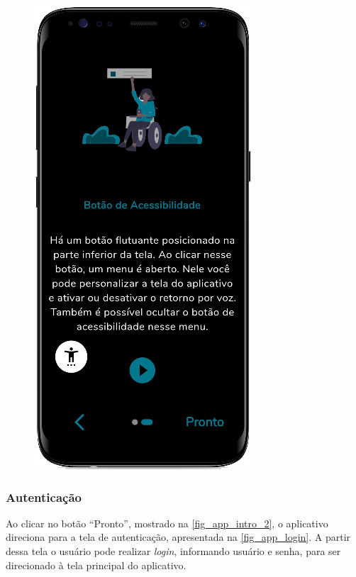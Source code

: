 \begin{figure}[htb]
\begin{minipage}{0.44\textwidth}
        \includegraphics[scale=0.63]{Imagens/desenvolvimento/app/app_intro_2.png}
    \end{minipage}
\end{figure}

\newpage

\subsubsection{Autenticação}

Ao clicar no botão ``Pronto'', mostrado na \autoref{fig_app_intro_2}, o aplicativo direciona para a tela de autenticação,
apresentada na \autoref{fig_app_login}. A partir dessa tela o usuário pode realizar \emph{login}, informando usuário e
senha, para ser direcionado à tela principal do aplicativo.

